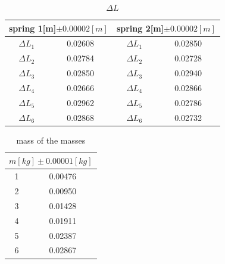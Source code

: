 \documentclass[11pt,a4paper]{article}
\begin{document}
\begin{table}[h]
    \centering
    \begin{tabular}{|c|c||c|c|}\hline
    \multicolumn{2}{|c||}{spring 1[m]$\pm 0.00002[m]$}&\multicolumn{2}{c|}{spring 2[m]$\pm 0.00002[m]$}\\\hline
    
    $\Delta L_1$&0.02608&$\Delta L_1$& 0.02850\\\hline
    $\Delta L_2$&0.02784 & $\Delta L_2$&0.02728 \\\hline
    $\Delta L_3$& 0.02850  &$\Delta L_3$& 0.02940 \\\hline
    $\Delta L_4$&0.02666 & $\Delta L_4$&0.02866 \\\hline
    $\Delta L_5$&0.02962 & $\Delta L_5$&0.02786\\\hline
    $\Delta L_6$&0.02868 & $\Delta L_6$&0.02732 \\\hline
    \end{tabular}
    \caption{$\Delta L$}
    \label{deltal}
\end{table}
\begin{table}[h]
    \centering
    \begin{tabular}{|c|c|}\hline
        \multicolumn{2}{|c|}{$m[kg]\pm0.00001[kg]$}\\\hline
    1 & 0.00476 \\\hline
    2 & 0.00950 \\\hline
    3 & 0.01428 \\\hline
    4 & 0.01911 \\\hline
    5 & 0.02387 \\\hline
    6 & 0.02867\\\hline
    \end{tabular}
    \caption{mass of the masses}
    \label{massofthemasses}
\end{table}
\end{document}
